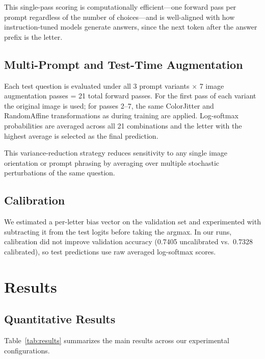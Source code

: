 \documentclass[11pt]{article}
\begin{document}
This single-pass scoring is computationally efficient---one forward pass per prompt regardless of the number of choices---and is well-aligned with how instruction-tuned models generate answers, since the next token after the answer prefix is the letter.

\subsection{Multi-Prompt and Test-Time Augmentation}

Each test question is evaluated under all 3 prompt variants $\times$ 7 image augmentation passes = 21 total forward passes. For the first pass of each variant the original image is used; for passes 2--7, the same ColorJitter and RandomAffine transformations as during training are applied. Log-softmax probabilities are averaged across all 21 combinations and the letter with the highest average is selected as the final prediction.

This variance-reduction strategy reduces sensitivity to any single image orientation or prompt phrasing by averaging over multiple stochastic perturbations of the same question.

\subsection{Calibration}

We estimated a per-letter bias vector on the validation set and experimented with subtracting it from the test logits before taking the argmax. In our runs, calibration did not improve validation accuracy (0.7405 uncalibrated vs.\ 0.7328 calibrated), so test predictions use raw averaged log-softmax scores.

\section{Results}

\subsection{Quantitative Results}

Table~\ref{tab:results} summarizes the main results across our experimental configurations.
\end{document}
